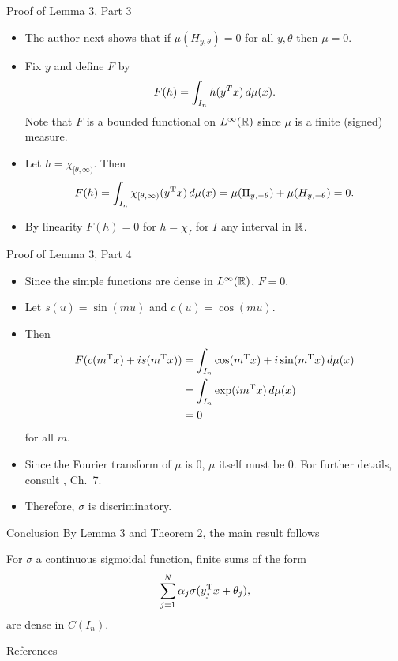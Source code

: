 \documentclass[11pt,letterpaper]{beamer}
\begin{document}
\begin{frame}{Proof of Lemma 3, Part 3}
  \begin{itemize}
  \item The author next shows that if $\mu(H_{ y,\theta})=0$ for all $ y,\theta$
    then $\mu=0$.
  \item Fix $y$ and define $F$ by
    \[
      F(h)=\int_{I_n} h( y^T x)\mathop{}\!d\mu(x).
    \]
    Note that $F$ is a bounded functional on $L^\infty(\mathbb{R})$ since $\mu$ is a
    finite (signed) measure.
  \item Let $h=\chi_{[\theta,\infty)}$. Then
    \[
      F(h)=\int_{I_n}\chi_{[\theta,\infty)}( y^{\mathrm{T}} x) \mathop{}\!d \mu(x)= \mu(\Pi_{
        y,-\theta})+\mu(H_{ y,-\theta})=0.
    \]
  \item By linearity $F(h)=0$ for $h=\chi_{I}$ for $I$ any interval in $\mathbb{R}$.
\end{itemize}
\end{frame}

\begin{frame}{Proof of Lemma 3, Part 4}
  \begin{itemize}
  \item Since the simple functions are dense in $L^\infty(\mathbb{R})$, $F=0$.
  \item Let $s(u)=\sin(mu)$ and $c(u)=\cos(mu)$.
  \item Then
    \begin{align*}
      F(c(m^{\mathrm{T}} x)+i s(m^{\mathrm{T}} x))
      &=\int_{I_n}\cos(m^{\mathrm{T}} x)+i\sin(m^{\mathrm{T}} x)\mathop{}\!d\mu(x)\\
      &=\int_{I_n}\exp(i m^{\mathrm{T}} x)\mathop{}\!d\mu(x)\\
      &=0
    \end{align*}
    for all $m$.
  \item Since the Fourier transform of $\mu$ is $0$, $\mu$ itself must be $0$.
    For further details, consult \cite{rudin}, Ch.\ 7.
  \item Therefore, $\sigma$ is discriminatory.
  \end{itemize}
\end{frame}

\begin{frame}{Conclusion}
  By Lemma 3 and Theorem 2, the main result follows
  \setcounter{theorem}{0}
  \begin{theorem}
    For $\sigma$ a continuous sigmoidal function, finite sums of the form
    \[
      \sum_{j=1}^N \alpha_j\sigma( y_j^{\mathrm{T}} x+\theta_j),
    \]
  are dense in $C(I_n)$.
  \end{theorem}
\end{frame}

\begin{frame}{References}
\printbibliography
\end{frame}
\end{document}
